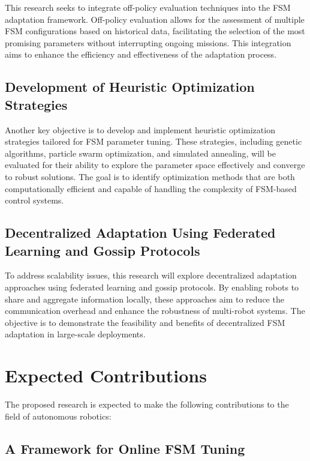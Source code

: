 \documentclass{ULBreport}
\begin{document}
This research seeks to integrate off-policy evaluation techniques into the FSM adaptation framework. Off-policy evaluation allows for the assessment of multiple FSM configurations based on historical data, facilitating the selection of the most promising parameters without interrupting ongoing missions. This integration aims to enhance the efficiency and effectiveness of the adaptation process.

\subsection{Development of Heuristic Optimization Strategies}

Another key objective is to develop and implement heuristic optimization strategies tailored for FSM parameter tuning. These strategies, including genetic algorithms, particle swarm optimization, and simulated annealing, will be evaluated for their ability to explore the parameter space effectively and converge to robust solutions. The goal is to identify optimization methods that are both computationally efficient and capable of handling the complexity of FSM-based control systems.

\subsection{Decentralized Adaptation Using Federated Learning and Gossip Protocols}

To address scalability issues, this research will explore decentralized adaptation approaches using federated learning and gossip protocols. By enabling robots to share and aggregate information locally, these approaches aim to reduce the communication overhead and enhance the robustness of multi-robot systems. The objective is to demonstrate the feasibility and benefits of decentralized FSM adaptation in large-scale deployments.

\section{Expected Contributions}

The proposed research is expected to make the following contributions to the field of autonomous robotics:

\subsection{A Framework for Online FSM Tuning}
\end{document}
